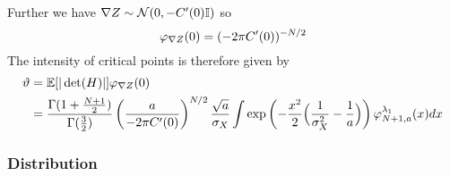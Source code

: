 Further we have \(\nabla Z\sim\mathcal{N}(0, -C'(0)\mathbb{I})\) so
\[
	\varphi_{\nabla Z}(0) = (-2\pi C'(0))^{-N/2}
\]
The intensity of critical points is therefore given by
\[\begin{aligned}
	\vartheta &= \mathbb{E}[|\det(H)|]\varphi_{\nabla Z}(0)\\
	&= \frac{\Gamma(1+\frac{N+1}2)}{\Gamma(\frac32)}
	\left(\frac{a}{-2\pi C'(0)}\right)^{N/2}
	\frac{\sqrt{a}}{\sigma_X}
	\int \exp\left(-\frac{x^2}{2}\Bigl(\frac1{\sigma_X^2}-\frac1a\Bigr)\right)
	\varphi^{\lambda_1}_{N+1,a}(x)dx
\end{aligned}\]

\subsubsection{Distribution}

